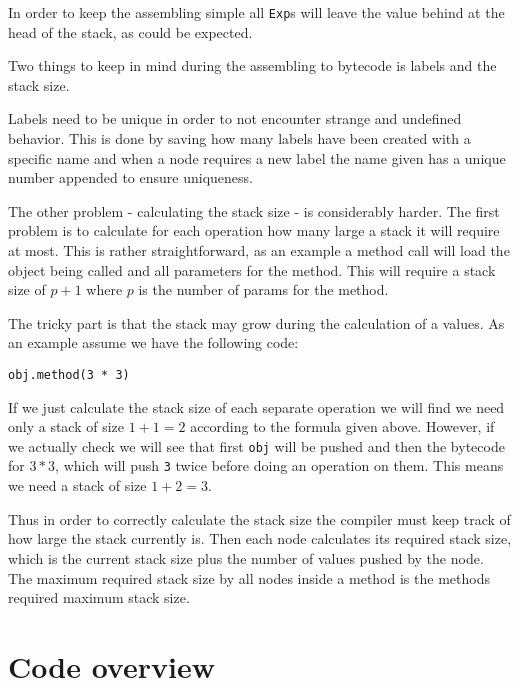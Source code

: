\documentclass[a4paper]{article}
\begin{document}
In order to keep the assembling simple all \texttt{Exp}s will leave the value behind at the head
of the stack, as could be expected.

Two things to keep in mind during the assembling to bytecode is labels and the stack size.

Labels need to be unique in order to not encounter strange and undefined behavior. This is done
by saving how many labels have been created with a specific name and when
a node requires a new label the name given has a unique number appended to ensure uniqueness.

The other problem - calculating the stack size - is considerably harder. The first problem
is to calculate for each operation how many large a stack it will require at most. This is
rather straightforward, as an example a method call will load the object being called
and all parameters for the method. This will require a stack size of $p + 1$ where $p$
is the number of params for the method.

The tricky part is that the stack may grow during the calculation of a values. As an example
assume we have the following code:

\begin{lstlisting}
obj.method(3 * 3)
\end{lstlisting}

If we just calculate the stack size of each separate operation we will find we need only
a stack of size $1 + 1 = 2$ according to the formula given above. However, if we actually
check we will see that first \texttt{obj} will be pushed and then the bytecode for $3 * 3$,
which will push \texttt{3} twice before doing an operation on them. This means we need a
stack of size $1+2 = 3$.

Thus in order to correctly calculate the stack size the compiler must keep track of how
large the stack currently is. Then each node calculates its required stack size, which is
the current stack size plus the number of values pushed by the node. The maximum required
stack size by all nodes inside a method is the methods required maximum stack size.

\section{Code overview}
\end{document}
